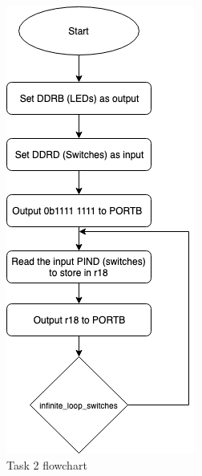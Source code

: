 \documentclass[a4paper,12pt]{article}
\begin{document}
\break
\begin{figure}
\begin{center}
\includegraphics[width=\textwidth/3]{flowchart/task2_flowchart.png}
\end{center}
\caption{Task 2 flowchart}
\label{task2}
\end{figure}
\end{document}
